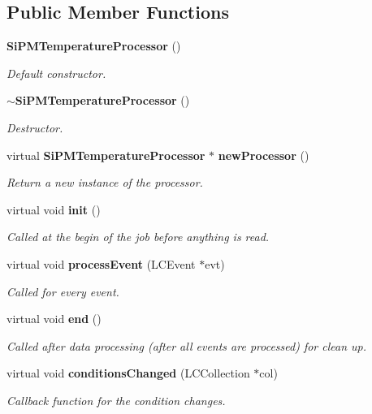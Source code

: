 \subsection*{Public Member Functions}
\begin{DoxyCompactItemize}
\item 
{\bf Si\-P\-M\-Temperature\-Processor} ()\label{classCALICE_1_1SiPMTemperatureProcessor_a04ac0bf7f828c454fb8dada5710e5106}

\begin{DoxyCompactList}\small\item\em Default constructor. \end{DoxyCompactList}\item 
{\bf $\sim$\-Si\-P\-M\-Temperature\-Processor} ()\label{classCALICE_1_1SiPMTemperatureProcessor_ac484602a86c82558880b3ebc1f62dc77}

\begin{DoxyCompactList}\small\item\em Destructor. \end{DoxyCompactList}\item 
virtual {\bf Si\-P\-M\-Temperature\-Processor} $\ast$ {\bf new\-Processor} ()\label{classCALICE_1_1SiPMTemperatureProcessor_ad65bd44b3ce6be3260e57c1fcb75dcba}

\begin{DoxyCompactList}\small\item\em Return a new instance of the processor. \end{DoxyCompactList}\item 
virtual void {\bf init} ()\label{classCALICE_1_1SiPMTemperatureProcessor_a900fb4beaa66160686582a75c7fe2968}

\begin{DoxyCompactList}\small\item\em Called at the begin of the job before anything is read. \end{DoxyCompactList}\item 
virtual void {\bf process\-Event} (L\-C\-Event $\ast$evt)
\begin{DoxyCompactList}\small\item\em Called for every event. \end{DoxyCompactList}\item 
virtual void {\bf end} ()\label{classCALICE_1_1SiPMTemperatureProcessor_a2cbda0153aeecea1be18a5a1b9eadb65}

\begin{DoxyCompactList}\small\item\em Called after data processing (after all events are processed) for clean up. \end{DoxyCompactList}\item 
virtual void {\bf conditions\-Changed} (L\-C\-Collection $\ast$col)
\begin{DoxyCompactList}\small\item\em Callback function for the condition changes. \end{DoxyCompactList}\end{DoxyCompactItemize}

